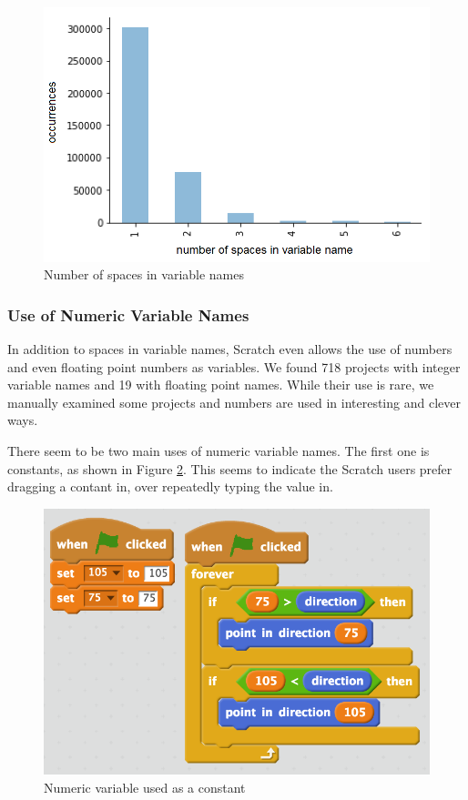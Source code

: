 \documentclass[conference]{IEEEtran}
\begin{document}
\begin{figure}
	\begin{center}
		\includegraphics[width=\columnwidth]{fig/spaces_varname_occurrences}
		\caption{Number of spaces in variable names}
		\label{fig:number_of_spaces}
	\end{center}
\end{figure} 

\subsubsection{Use of Numeric Variable Names}
In addition to spaces in variable names, Scratch even allows the use of numbers and even floating point numbers as variables. We found 718 projects with integer variable names and 19 with floating point names. While their use is rare, we manually examined some projects and numbers are used in interesting and clever ways. 

There seem to be two main uses of numeric variable names. The first one is constants, as shown in Figure \ref{fig:constants}. This seems to indicate the Scratch users prefer dragging a contant in, over repeatedly typing the value in. 

\begin{figure}
	\begin{center}
		\includegraphics[width=\columnwidth]{fig/constants}
		\caption{Numeric variable used as a constant}
		\label{fig:constants}
	\end{center}
\end{figure} 
\end{document}
